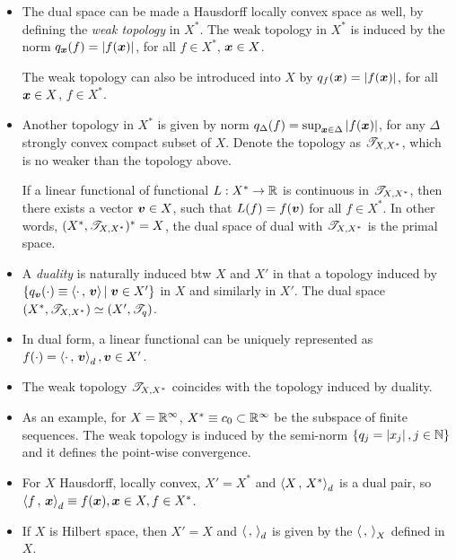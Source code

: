 \documentclass[11pt]{article}
\begin{document}
\begin{itemize}
\item The dual space can be made a Hausdorff locally convex space as well, by defining the \emph{weak topology} in $X^{*}$. The weak topology in $X^{*}$ is induced by the norm $q_{\boldsymbol{x}}(f) = \left\lvert f(\boldsymbol{x}) \right\rvert$, for all $f\in X^{*}$, $\boldsymbol{x}\in X$.

The weak topology can also be introduced into $X$ by $q_{f}(\boldsymbol{x}) = \left\lvert f(\boldsymbol{x}) \right\rvert$, for all  $\boldsymbol{x}\in X$, $f\in X^{*}$.


\item Another topology in $X^{*}$ is given by norm $q_{\Delta}(f) = \sup_{\boldsymbol{x}\in \Delta}\left\lvert f(\boldsymbol{x}) \right\rvert$, for any $\Delta$ strongly convex compact subset of $X$. Denote the topology as ${\mathscr T}_{X, X^{*}}$,  which is no weaker than the topology above. 

If a linear functional of functional $L: X^{*} \rightarrow {\mathbb R}$ is continuous in ${\mathscr T}_{X, X^{*}}$, then there exists a vector $\boldsymbol{v}\in X$, such that $L(f) = f(\boldsymbol{v})$ for all $f\in X^{*}$. In other words, $(X^{*}, {\mathscr T}_{X, X^{*}})^{*} = X$, the dual space of dual with ${\mathscr T}_{X, X^{*}}$ is the primal space. \\

\item A \emph{duality} is naturally induced btw $X$ and $X'$ in that a topology induced by $\left\{ q_{\boldsymbol{v}}(\cdot) \equiv \left\langle \cdot\,,\, \boldsymbol{v} \right\rangle| \; \boldsymbol{v}\in X'\right\}$ in $X$ and similarly in $X'$. The dual space $(X^{*}, {\mathscr T}_{X, X^{*}}) \simeq (X', {\mathscr T}_{q})$.

\item In dual form, a linear functional can be uniquely represented as $f(\cdot) = \left\langle \cdot\,,\, \boldsymbol{v} \right\rangle_{d}, \boldsymbol{v}\in X'$.

\item The weak topology ${\mathscr T}_{X, X^{*}}$ coincides with the topology induced by duality. 

\item As an example, for $X={\mathbb R}^{\infty}$, $X^{*}\equiv c_{0} \subset {\mathbb R}^{\infty}$ be the subspace of finite sequences. The weak topology is induced by the semi-norm $\left\{q_{j} = \left\lvert x_{j} \right\rvert, j\in {\mathbb N}\right\}$ and it defines the point-wise convergence. 

\item For $X$ Hausdorff, locally convex, $X'=X^{*}$ and $\left\langle X\,,\, X^{*} \right\rangle_{d}$ is a dual pair, so $\left\langle f\,,\, \boldsymbol{x} \right\rangle_{d} \equiv f(\boldsymbol{x}), \boldsymbol{x}\in X, f\in X^{*}$. 

\item If $X$ is Hilbert space, then $X' = X$ and $\left\langle \,,\,  \right\rangle_{d}$ is given by the $\left\langle \,,\,  \right\rangle_{X}$ defined in $X$. 
\end{itemize}
\end{document}
